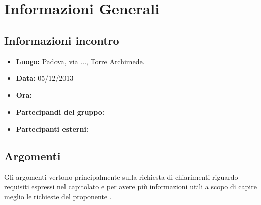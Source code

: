 \section{Informazioni Generali}
	\subsection{Informazioni incontro}
	\begin{itemize}
		\item {\bfseries Luogo:} Padova, via ..., Torre Archimede.
		\item {\bfseries Data:} 05/12/2013
		\item {\bfseries Ora:}
		\item {\bfseries Partecipandi del gruppo:}
		\item {\bfseries Partecipanti esterni:}
	\end{itemize}
	
	\subsection{Argomenti}
		Gli argomenti vertono principalmente sulla richiesta di chiarimenti riguardo requisiti espressi nel capitolato e per avere più informazioni utili a scopo di capire meglio le richieste del proponente \Proponente.